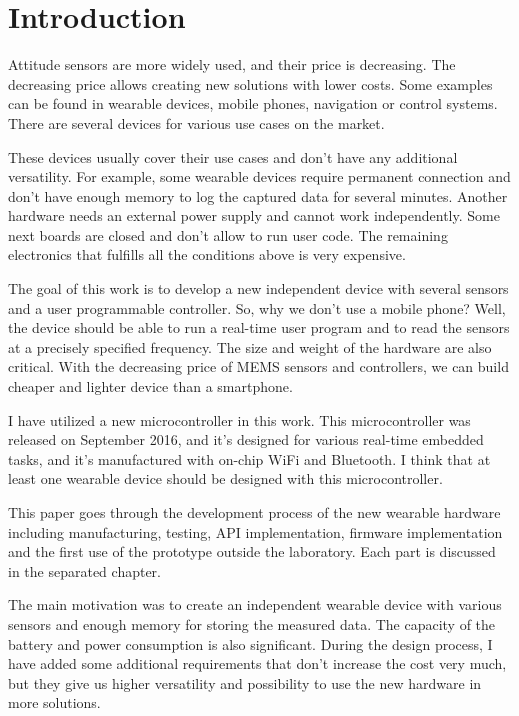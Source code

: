 \chapter{Introduction}
Attitude sensors are more widely used, and their price is decreasing. The decreasing price allows creating new solutions with lower costs. Some examples can be found in wearable devices, mobile phones, navigation or control systems. There are several devices for various use cases on the market.

These devices usually cover their use cases and don't have any additional versatility. For example, some wearable devices require permanent connection and don't have enough memory to log the captured data for several minutes. Another hardware needs an external power supply and cannot work independently. Some next boards are closed and don't allow to run user code. The remaining electronics that fulfills all the conditions above is very expensive.

The goal of this work is to develop a new independent device with several sensors and a user programmable controller. So, why we don't use a mobile phone? Well, the device should be able to run a real-time user program and to read the sensors at a precisely specified frequency. The size and weight of the hardware are also critical. With the decreasing price of \ac{MEMS} sensors and controllers, we can build cheaper and lighter device than a smartphone.

I have utilized a new microcontroller in this work. This microcontroller was released on September 2016, and it's designed for various real-time embedded tasks, and it's manufactured with on-chip WiFi and Bluetooth. I think that at least one wearable device should be designed with this microcontroller.

This paper goes through the development process of the new wearable hardware including manufacturing, testing, API implementation, firmware implementation and the first use of the prototype outside the laboratory. Each part is discussed in the separated chapter.

The main motivation was to create an independent wearable device with various sensors and enough memory for storing the measured data. The capacity of the battery and power consumption is also significant. During the design process, I have added some additional requirements that don't increase the cost very much, but they give us higher versatility and possibility to use the new hardware in more solutions.

